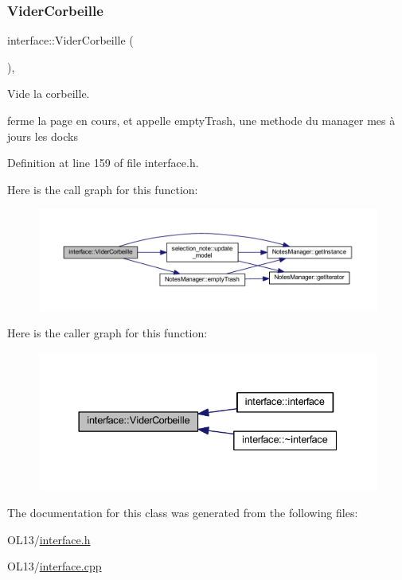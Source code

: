 \subsubsection{\texorpdfstring{Vider\+Corbeille}{ViderCorbeille}}
{\footnotesize\ttfamily interface\+::\+Vider\+Corbeille (\begin{DoxyParamCaption}{ }\end{DoxyParamCaption})\hspace{0.3cm}{\ttfamily [inline]}, {\ttfamily [slot]}}



Vide la corbeille. 

ferme la page en cours, et appelle empty\+Trash, une methode du manager mes à jours les docks 

Definition at line 159 of file interface.\+h.

Here is the call graph for this function\+:\nopagebreak
\begin{figure}[H]
\begin{center}
\leavevmode
\includegraphics[width=350pt]{classinterface_a430ee153cb2ea74b9103081d48cd61f3_cgraph}
\end{center}
\end{figure}
Here is the caller graph for this function\+:\nopagebreak
\begin{figure}[H]
\begin{center}
\leavevmode
\includegraphics[width=337pt]{classinterface_a430ee153cb2ea74b9103081d48cd61f3_icgraph}
\end{center}
\end{figure}


The documentation for this class was generated from the following files\+:\begin{DoxyCompactItemize}
\item 
O\+L13/\hyperlink{interface_8h}{interface.\+h}\item 
O\+L13/\hyperlink{interface_8cpp}{interface.\+cpp}\end{DoxyCompactItemize}
